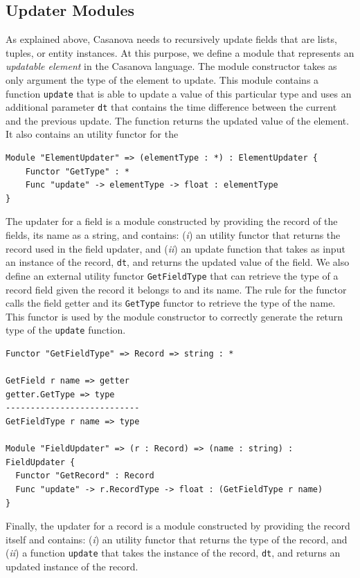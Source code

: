 \subsection{Updater Modules}
\label{subsec:ch_networking_updater_modules}
As explained above, Casanova needs to recursively update fields that are lists, tuples, or entity instances. At this purpose, we define a module that represents an \textit{updatable element} in the Casanova language. The module constructor takes as only argument the type of the element to update. This module contains a function \texttt{update} that is able to update a value of this particular type and uses an additional parameter \texttt{dt} that contains the time difference between the current and the previous update. The function returns the updated value of the element. It also contains an utility functor for the 
 
\begin{lstlisting}
Module "ElementUpdater" => (elementType : *) : ElementUpdater {
	Functor "GetType" : *
	Func "update" -> elementType -> float : elementType
}
\end{lstlisting}

\noindent
The updater for a field is a module constructed by providing the record of the fields, its name as a string, and contains: (\textit{i}) an utility functor that returns the record used in the field updater, and (\textit{ii}) an update function that takes as input an instance of the record, \texttt{dt}, and returns the updated value of the field. We also define an external utility functor \texttt{GetFieldType} that can retrieve the type of a record field given the record it belongs to and its name. The rule for the functor calls the field getter and its \texttt{GetType} functor to retrieve the type of the name. This functor is used by the module constructor to correctly generate the return type of the \texttt{update} function.

\begin{lstlisting}
Functor "GetFieldType" => Record => string : *

GetField r name => getter
getter.GetType => type
---------------------------
GetFieldType r name => type

Module "FieldUpdater" => (r : Record) => (name : string) : FieldUpdater {
  Functor "GetRecord" : Record
  Func "update" -> r.RecordType -> float : (GetFieldType r name)
}
\end{lstlisting}

\noindent
Finally, the updater for a record is a module constructed by providing the record itself and contains: (\textit{i}) an utility functor that returns the type of the record, and (\textit{ii}) a function \texttt{update} that takes the instance of the record, \texttt{dt}, and returns an updated instance of the record.

